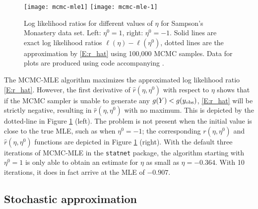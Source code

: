 \begin{figure}[h]  \label{F:MCMC-MLE}
\begin{center} 
{\texttt{[image: mcmc-mle1]}}
{\texttt{[image: mcmc-mle-1]}}
\end{center} 
\caption{Log likelihood ratios for different values of $\eta$ for Sampson's 
Monastery data set.  Left: $\eta^0 = 1$, right: $\eta^0 = -1$. Solid lines are exact log likelihood ratios $\ell(\eta) - \ell(\eta^0)$, dotted lines are the 
approximation by \eqref{E:r_hat} using 100,000 MCMC samples.  Data for plots are produced using code accompanying \citet{Hummel}.} 
\end{figure} 

The MCMC-MLE algorithm maximizes the approximated log 
likelihood ratio \eqref{E:r_hat}.  However, the first derivative of $\hat{r}(\eta,\eta^0)$ with respect
to $\eta$ shows that if the MCMC sampler is unable to generate any $g(Y)< g(y_{\textrm{obs}})$, 
\eqref{E:r_hat} will be strictly negative, resulting in $\hat{r}(\eta,\eta^0)$ with no
maximum.  This is depicted by the dotted-line in Figure \ref{F:MCMC-MLE} (left).  
The problem is not present when the initial value is close to the true MLE, such as 
when $\eta^0 = -1$; the corresponding $r(\eta,\eta^0)$ and $\hat{r}(\eta,\eta^0)$ 
functions are depicted in Figure \ref{F:MCMC-MLE} (right).  With the default three 
iterations of MCMC-MLE in the \texttt{statnet} package, the algorithm 
starting with $\eta^0 = 1$ is only able to obtain an estimate for $\eta$ as 
small as $\eta = -0.364$.  With 10 iterations, it does in fact 
arrive at the MLE of $-0.907$.
 





%

    

\subsection{Stochastic approximation}

